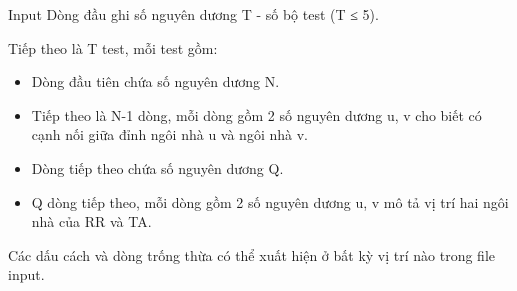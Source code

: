 Input
Dòng đầu ghi số nguyên dương T - số bộ test (T ≤ 5).  

   Tiếp theo là T test, mỗi test gồm:  
\begin{itemize}
	\item     Dòng đầu tiên chứa số nguyên dương N.   
	\item     Tiếp theo là N-1 dòng, mỗi dòng gồm 2 số nguyên dương u, v cho biết có cạnh nối giữa đỉnh ngôi nhà u và ngôi nhà v.   
	\item     Dòng tiếp theo chứa số nguyên dương Q.   
	\item     Q dòng tiếp theo, mỗi dòng gồm 2 số nguyên dương u, v mô tả vị trí hai ngôi nhà của RR và TA.   
\end{itemize}

   Các dấu cách và dòng trống thừa có thể xuất hiện ở bất kỳ vị trí nào trong file input.